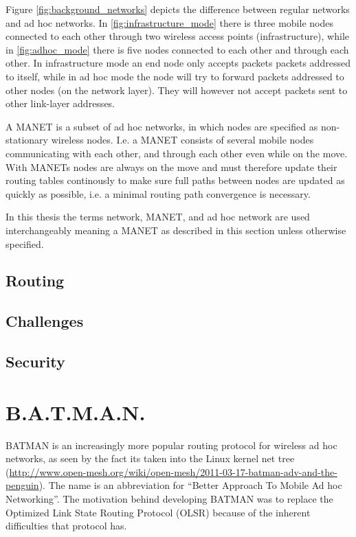 Figure \ref{fig:background_networks} depicts the difference between regular
networks and ad hoc networks. In \ref{fig:infrastructure_mode} there is three
mobile nodes connected to each other through two wireless access points
(infrastructure), while in \ref{fig:adhoc_mode} there is five nodes connected to
each other and through each other. In infrastructure mode an end node only
accepts packets packets addressed to itself, while in ad hoc mode the node will
try to forward packets addressed to other nodes (on the network layer). They
will however not accept packets sent to other link-layer addresses.



A \ac{MANET} is a subset of ad hoc networks, in which nodes are specified as
non-stationary wireless nodes. I.e. a \ac{MANET} consists of several mobile
nodes communicating with each other, and through each other even while on the
move. With \acp{MANET} nodes are always on the move and must therefore update
their routing tables continously to make sure full paths between nodes are
updated as quickly as possible, i.e. a minimal routing path convergence is
necessary.

In this thesis the terms network, \ac{MANET}, and ad hoc network are used
interchangeably meaning a \ac{MANET} as described in this section unless
otherwise specified.

\subsection{Routing}

\subsection{Challenges}

\subsection{Security}

\section{B.A.T.M.A.N.}
BATMAN \cite{batman_rfc} is an increasingly more popular routing protocol for
wireless ad hoc networks, as seen by the fact its taken into the Linux kernel
net tree
(\url{http://www.open-mesh.org/wiki/open-mesh/2011-03-17-batman-adv-and-the-penguin}).
The name is an abbreviation for ``Better Approach To Mobile Ad hoc Networking''.
The motivation behind developing BATMAN was to replace the Optimized Link State
Routing Protocol (OLSR) \cite{why-starting-batman} because of the inherent
difficulties that protocol has.

